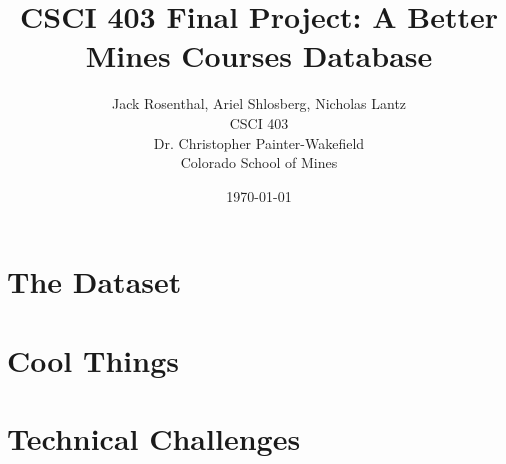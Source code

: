 \documentclass[12pt,letterpaper,titlepage]{article}
\title{CSCI 403 Final Project:
       A Better Mines Courses Database}
\date{\today}
\author{Jack Rosenthal, Ariel Shlosberg, Nicholas Lantz\\
        \small CSCI 403\\
        \small Dr. Christopher Painter-Wakefield\\
        \small Colorado School of Mines}
\begin{document}
\maketitle

\section{The Dataset}
\section{Cool Things}


\section{Technical Challenges}

\end{document}
